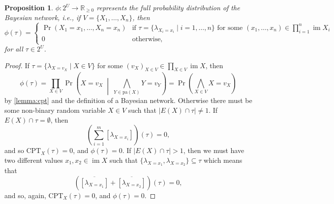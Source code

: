 \documentclass{article}
\newtheorem{proposition}{Proposition}
\theoremstyle{definition}
\theoremstyle{remark}
\DeclareMathOperator{\im}{im}
\begin{document}
\begin{proposition} \label{lemma:full_distribution}
  $\phi\colon 2^U \to \mathbb{R}_{\ge 0}$ represents the full probability
  distribution of the Bayesian network, i.e., if $V = \{ X_1, \dots, X_n\}$,
  then
  \[
    \phi(\tau) =
    \begin{cases}
      \Pr(X_1 = x_1, \dots, X_n = x_n) & \text{if } \tau = \{ \lambda_{X_i=x_i}
      \mid i = 1, \dots, n \} \text{ for some } (x_1, \dots, x_n) \in
      \prod_{i=1}^n \im X_i \\
      0 & \text{otherwise,}
    \end{cases}
  \]
  for all $\tau \in 2^U$.
\end{proposition}
\begin{proof}
  If $\tau = \{ \lambda_{X=v_X} \mid X \in V \}$ for some $(v_X)_{X \in V} \in
  \prod_{X \in V} \im X$, then
  \[
    \phi(\tau) = \prod_{X \in V} \Pr \left( X=v_X \;\middle|\; \bigwedge_{Y \in
        \mathrm{pa}(X)} Y=v_Y \right) = \Pr \left( \bigwedge_{X \in V} X=v_X
    \right)
  \]
  by \cref{lemma:cpt} and the definition of a Bayesian network. Otherwise there
  must be some non-binary random variable $X \in V$ such that $|E(X) \cap \tau|
  \ne 1$. If $E(X) \cap \tau = \emptyset$, then
  \[
    \left( \sum_{i=1}^m [\lambda_{X = x_i}] \right)(\tau) = 0,
  \]
  and so $\mathrm{CPT}_X(\tau) = 0$, and $\phi(\tau) = 0$. If $|E(X) \cap
  \tau| > 1$, then we must have two different values $x_1, x_2 \in \im X$ such
  that $\{\lambda_{X=x_1}, \lambda_{X=x_2} \} \subseteq \tau$ which means that
  \[
    (\overline{[\lambda_{X=x_1}]} + \overline{[\lambda_{X=x_2}]})(\tau) = 0,
  \]
  and so, again, $\mathrm{CPT}_X(\tau) = 0$, and $\phi(\tau) = 0$.
\end{proof}
\end{document}
